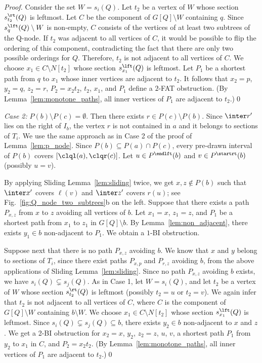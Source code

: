 \begin{proof}
Consider the set $W = s_i(Q)$. Let $t_2$ be a vertex of $W$ whose section $s_{t_2}^\rt(Q)$ is
leftmost. Let $C$ be the component of $G[Q] \setminus W$ containing $q$. Since $s_q^\lft(Q)
\setminus W$ is non-empty, $C$ consists of the vertices of at least two subtrees of the Q-node. If
$t_2$ was adjacent to all vertices of $C$, it would be possible to flip the ordering of this
component, contradicting the fact that there are only two possible orderings for $Q$. Therefore,
$t_2$ is not adjacent to all vertices of $C$.  We choose $x_1 \in C \setminus N[t_2]$ whose section
$s_{x_1}^\lft(Q)$ is leftmost.  Let $P_1$ be a shortest path from $q$ to $x_1$ whose inner vertices
are adjacent to $t_2$. It follows that $x_2 = p$, $y_2 = q$, $z_2 = r$, $P_2 = x_2t_2$, $t_2$,
$x_1$, and $P_1$ define a $2$-FAT obstruction. (By Lemma~\ref{lem:monotone_paths}, all inner
vertices of $P_1$ are adjacent to $t_2$.)\qed

\emph{Case 2:} $P(b) \setminus P(c) = \emptyset$. Then there exists $r \in P(c) \setminus P(b)$.
Since $\inter r'$ lies on the right of $I_b$, the vertex $r$ is not contained in $a$ and it belongs
to sections of $T_i$. We use the same approach as in Case 2 of the proof of Lemma~\ref{lem:p_node}.
Since $P(b) \subseteq P(a) \cap P(c)$, every pre-drawn interval of $P(b)$ covers
$[\clql(a),\clqr(c)]$.  Let $u \in P^\endlft(b)$ and $v \in P^\startrt(b)$ (possibly $u=v$).

By applying Sliding Lemma~\ref{lem:sliding} twice, we get $x,z \notin P(b)$ such that $\inter x'$
covers $\ell(v)$ and $\inter z'$ covers $r(u)$; see Fig.~\ref{fig:Q_node_two_subtrees}b on the left.
Suppose that there exists a path $P_{x,z}$ from $x$ to $z$ avoiding all vertices of $b$. Let $x_1 =
x$, $z_1 = z$, and $P_1$ be a shortest path from $x_1$ to $z_1$ in $G[Q] \setminus b$.
By Lemma~\ref{lem:non_adjacent}, there exists $y_1 \in b$ non-adjacent to $P_1$. We
obtain a $1$-BI obstruction.

Suppose next that there is no path $P_{x,z}$ avoiding $b$.  We know that $x$ and $y$ belong to
sections of $T_i$, since there exist paths $P_{x,p}$ and $P_{r,z}$ avoiding $b$, from the above
applications of Sliding Lemma~\ref{lem:sliding}.  Since no path $P_{x,z}$ avoiding $b$ exists, we
have $s_i(Q) \subsetneq s_j(Q)$.  As in Case 1, let $W = s_i(Q)$, and let $t_2$ be a vertex of $W$
whose section $s_{t_2}^\rt(Q)$ is leftmost (possibly $t_2 = u$ or $t_2 = v$).  We again infer that
$t_2$ is not adjacent to all vertices of $C$, where $C$ is the component of $G[Q] \setminus W$
containing $b \setminus W$. We choose $x_1 \in C \setminus N[t_2]$ whose section $s_{x_1}^\lft(Q)$
is leftmost. Since $s_i(Q) \subsetneq s_j(Q) \subseteq b$, there exists $y_2 \in b$ non-adjacent to
$x$ and $z$. We get a 2-BI obstruction for $x_2 = x$, $y_2$, $z_2 = z$, $u$, $v$, a shortest path
$P_1$ from $y_2$ to $x_1$ in $C$, and $P_2 = x_2t_2$. (By Lemma~\ref{lem:monotone_paths}, all inner
vertices of $P_1$ are adjacent to $t_2$.)\qed
\end{proof}

